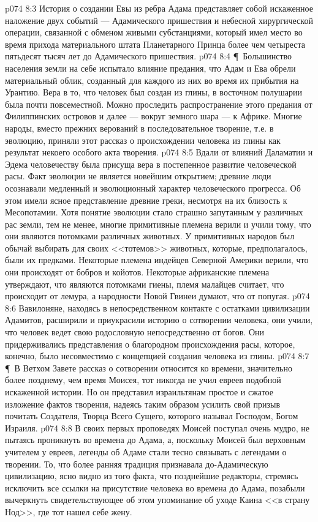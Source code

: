 \vs p074 8:3 История о создании Евы из ребра Адама представляет собой искаженное наложение двух событий --- Адамического пришествия и небесной хирургической операции, связанной с обменом живыми субстанциями, который имел место во время прихода материального штата Планетарного Принца более чем четыреста пятьдесят тысяч лет до Адамического пришествия.
\vs p074 8:4 \P\ Большинство населения земли на себе испытало влияние предания, что Адам и Ева обрели материальный облик, созданный для каждого из них во время их прибытия на Урантию. Вера в то, что человек был создан из глины, в восточном полушарии была почти повсеместной. Можно проследить распространение этого предания от Филиппинских островов и далее --- вокруг земного шара --- к Африке. Многие народы, вместо прежних верований в последовательное творение, т.е. в эволюцию, приняли этот рассказ о происхождении человека из глины как результат некоего особого акта творения.
\vs p074 8:5 Вдали от влияний Даламатии и Эдема человечеству была присуща вера в постепенное развитие человеческой расы. Факт эволюции не является новейшим открытием; древние люди осознавали медленный и эволюционный характер человеческого прогресса. Об этом имели ясное представление древние греки, несмотря на их близость к Месопотамии. Хотя понятие эволюции стало страшно запутанным у различных рас земли, тем не менее, многие примитивные племена верили и учили тому, что они являются потомками различных животных. У примитивных народов был обычай выбирать для своих <<тотемов>> животных, которые, предполагалось, были их предками. Некоторые племена индейцев Северной Америки верили, что они происходят от бобров и койотов. Некоторые африканские племена утверждают, что являются потомками гиены, племя малайцев считает, что происходит от лемура, а народности Новой Гвинеи думают, что от попугая.
\vs p074 8:6 Вавилоняне, находясь в непосредственном контакте с остатками цивилизации Адамитов, расширили и приукрасили историю о сотворении человека, они учили, что человек ведет свою родословную непосредственно от богов. Они придерживались представления о благородном происхождения расы, которое, конечно, было несовместимо с концепцией создания человека из глины.
\vs p074 8:7 \P\ В Ветхом Завете рассказ о сотворении относится ко времени, значительно более позднему, чем время Моисея, тот никогда не учил евреев подобной искаженной истории. Но он представил израильтянам простое и сжатое изложение фактов творения, надеясь таким образом усилить свой призыв почитать Создателя, Творца Всего Сущего, которого называл Господом, Богом Израиля.
\vs p074 8:8 В своих первых проповедях Моисей поступал очень мудро, не пытаясь проникнуть во времена до Адама, а, поскольку Моисей был верховным учителем у евреев, легенды об Адаме стали тесно связывать с легендами о творении. То, что более ранняя традиция признавала до\hyp{}Адамическую цивилизацию, ясно видно из того факта, что позднейшие редакторы, стремясь исключить все ссылки на присутствие человека во времена до Адама, позабыли вычеркнуть свидетельствующее об этом упоминание об уходе Каина <<в страну Нод>>, где тот нашел себе жену.
